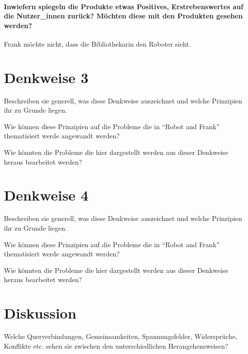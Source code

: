 \documentclass[sigchi-a, authorversion]{acmart}
\begin{document}
\paragraph
{Inwiefern spiegeln die Produkte etwas Positives, Erstrebenswertes auf die Nutzer\_innen zurück? Möchten diese mit den Produkten gesehen werden?}

Frank möchte nicht, dass die Bibliothekarin den Roboter sieht.

\section{Denkweise 3}

Beschreiben sie generell, was diese Denkweise auszeichnet und welche Prinzipien ihr zu Grunde liegen.

Wie können diese Prinzipien auf die Probleme die in ``Robot and Frank'' thematisiert werde angewandt werden?

Wie könnten die Probleme die hier dargestellt werden aus dieser Denkweise heraus bearbeitet werden?

\section{Denkweise 4}

Beschreiben sie generell, was diese Denkweise auszeichnet und welche Prinzipien ihr zu Grunde liegen.

Wie können diese Prinzipien auf die Probleme die in ``Robot and Frank'' thematisiert werde angewandt werden?

Wie könnten die Probleme die hier dargestellt werden aus dieser Denkweise heraus bearbeitet werden?


\section{Diskussion}

Welche Querverbindungen, Gemeinsamkeiten, Spannungsfelder, Widersprüche, Konflikte etc. sehen sie zwischen den unterschiedlichen Herangehensweisen?
\end{document}
